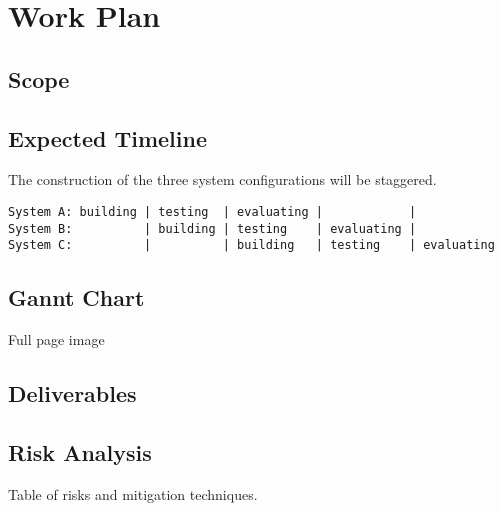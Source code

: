 
\newpage
\section{Work Plan}

\subsection*{Scope}

\subsection*{Expected Timeline}
The construction of the three system configurations will be staggered.
\begin{verbatim}
System A: building | testing  | evaluating |            |
System B:          | building | testing    | evaluating |
System C:          |          | building   | testing    | evaluating
\end{verbatim}


\subsection*{Gannt Chart}

Full page image

\subsection*{Deliverables}


\subsection{Risk Analysis}

Table of risks and mitigation techniques.
